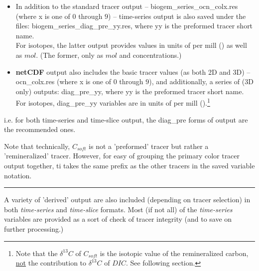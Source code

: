 \begin{itemize}[noitemsep]
\vspace{1mm}
\item In addition to the standard tracer output -- \textsf{\footnotesize biogem\_series\_ocn\_colx.res} (where \textsf{\footnotesize x} is one of \(0\) through \(9\)) -- time-series output is also saved under the files: \textsf{\footnotesize biogem\_series\_diag\_pre\_yy.res}, where \textsf{\footnotesize yy} is the preformed tracer short name. 
\\For isotopes, the latter output provides values in units of per mill (\permille) as well as \(mol\). (The former, only as \(mol\) and concentrations.)
\vspace{1mm}
\item \textbf{netCDF} output also includes the basic tracer values (as both 2D and 3D) -- \textsf{\footnotesize ocn\_colx.res} (where \textsf{\footnotesize x} is one of \(0\) through \(9\)), and additionally, a series of (3D only) outputs: \textsf{\footnotesize diag\_pre\_yy}, where \textsf{\footnotesize yy} is the preformed tracer short name. For isotopes, \textsf{\footnotesize diag\_pre\_yy} variables are in units of per mill (\permille).\footnote{Note that the \(\delta^{13}C\) of \(C_{soft}\) is the isotopic value of the remineralized carbon, \uline{not} the contribution to \(\delta^{13}C\) of \(DIC\). See following section.}
\end{itemize}
\vspace{1mm}
i.e. for both time-series and time-slice output, the \textsf{\footnotesize diag\_pre} forms of output are the recommended ones.

\vspace{1mm}
\noindent Note that technically, \(C_{soft}\) is not a 'preformed' tracer but rather a 'remineralized' tracer. However, for easy of grouping the primary color tracer output together, ti takes the same prefix as the other tracers in the saved variable notation.

\vspace{1mm}
\noindent\rule{4cm}{0.5pt}
\vspace{2mm}

\noindent A variety of 'derived' output are also included (depending on tracer selection) in both \textit{time-series} and \textit{time-slice} formats. Most (if not all) of the \textit{time-series} variables are provided as a  sort of check of tracer integrity (and to save on further processing.)

